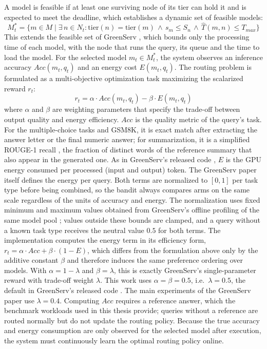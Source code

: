 A model is feasible if at least one surviving node of its tier can hold it and is expected to meet the deadline, which establishes a dynamic set of feasible models:
$$ M_t^* = \{m \in M \mid \exists\, n \in N_t : \mathrm{tier}(n) = \mathrm{tier}(m) \,\wedge\, s_m \le S_n \,\wedge\, \hat{T}(m, n) \le T_{max}\} $$
This extends the feasible set of GreenServ \cite{greenserv}, which bounds only the processing time of each model, with the node that runs the query, its queue and the time to load the model.
For the selected model $m_t \in M_t^*$, the system observes an inference accuracy $Acc(m_t, q_t)$ and an energy cost $E(m_t, q_t)$.
The routing problem is formulated as a multi-objective optimization task maximizing the scalarized reward $r_t$:
$$ r_t = \alpha \cdot Acc(m_t, q_t) - \beta \cdot E(m_t, q_t) $$
where $\alpha$ and $\beta$ are weighting parameters that specify the trade-off between output quality and energy efficiency.
$Acc$ is the quality metric of the query's task.
For the multiple-choice tasks and GSM8K, it is exact match after extracting the answer letter or the final numeric answer; for summarization, it is a simplified ROUGE-1 recall \cite{rouge}, the fraction of distinct words of the reference summary that also appear in the generated one.
As in GreenServ's released code \cite{greenserv_code}, $E$ is the GPU energy consumed per processed (input and output) token. The GreenServ paper itself defines the energy per query. Both terms are normalized to $[0, 1]$ per task type before being combined, so the bandit always compares arms on the same scale regardless of the units of accuracy and energy.
The normalization uses fixed minimum and maximum values obtained from GreenServ's offline profiling of the same model pool \cite{greenserv_code}; values outside these bounds are clamped, and a query without a known task type receives the neutral value $0.5$ for both terms.
The implementation computes the energy term in its efficiency form, $r_t = \alpha \cdot Acc + \beta \cdot (1 - E)$, which differs from the formulation above only by the additive constant $\beta$ and therefore induces the same preference ordering over models.
With $\alpha = 1 - \lambda$ and $\beta = \lambda$, this is exactly GreenServ's single-parameter reward with trade-off weight $\lambda$.
This work uses $\alpha = \beta = 0.5$, i.e.\ $\lambda = 0.5$, the default in GreenServ's released code \cite{greenserv_code}.
The main experiments of the GreenServ paper use $\lambda = 0.4$.
Computing $Acc$ requires a reference answer, which the benchmark workloads used in this thesis provide; queries without a reference are routed normally but do not update the routing policy.
Because the true accuracy and energy consumption are only observed for the selected model after execution, the system must continuously learn the optimal routing policy online.


